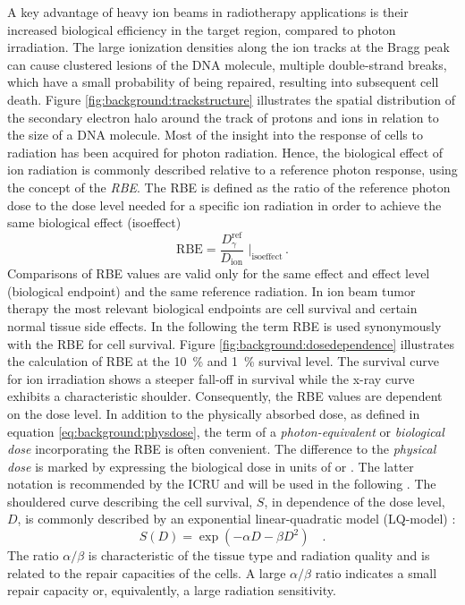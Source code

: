 A key advantage of heavy ion beams in radiotherapy applications is
their increased biological efficiency in the target region, compared
to photon irradiation. The large ionization densities along the ion
tracks at the Bragg peak can cause clustered lesions of the \ac{DNA}
molecule, \ie multiple double-strand breaks, which have a small
probability of being repaired, resulting into subsequent cell
death. Figure \ref{fig:background:trackstructure} illustrates the
spatial distribution of the secondary electron halo around the track
of protons and \Ctw ions in relation to the size of a \ac{DNA}
molecule. Most of the insight into the response of cells to radiation
has been acquired for photon radiation. Hence, the biological effect
of ion radiation is commonly described relative to a reference photon
response, using the concept of the \emph{\ac{RBE}}. The \ac{RBE} is
defined as the ratio of the reference photon dose to the dose level
needed for a specific ion radiation in order to achieve the same
biological effect (isoeffect)
\begin{equation}
  \text{RBE}=\frac{D_\gamma^\text{ref}}{D_\text{ion}}\,\,\bigg|_\text{isoeffect}\,.
  \label{eq:background:rbe}
\end{equation}
Comparisons of \acs{RBE} values are valid only for the same effect and
effect level (biological endpoint) and the same reference
radiation. In ion beam tumor therapy the most relevant biological
endpoints are cell survival and certain normal tissue side effects. In
the following the term \ac{RBE} is used synonymously with the \ac{RBE}
for cell survival. Figure \vref{fig:background:dosedependence}
illustrates the calculation of \ac{RBE} at the \SI{10}{\%} and
\SI{1}{\%} survival level.  The survival curve for ion irradiation
shows a steeper fall-off in survival while the x-ray curve exhibits a
characteristic shoulder. Consequently, the \ac{RBE} values are
dependent on the dose level.  In addition to the physically absorbed
dose, as defined in equation \eqref{eq:background:physdose}, the term
of a \emph{photon-equivalent} or \emph{biological dose} incorporating
the \ac{RBE} is often convenient. The difference to the \emph{physical
  dose} is marked by expressing the biological dose in units of
\si{\GyE} or \si{\GyRBE}. The latter notation is recommended by the
\ac{ICRU} and will be used in the following \citep{ICRU78}.  The
shouldered curve describing the cell survival, $S$, in dependence of
the dose level, $D$, is commonly described by an exponential
linear-quadratic model (LQ-model) \citep{Fowler1989}:
\begin{equation}
  S(D)=\exp\left(-\alpha D-\beta D^2\right)\quad.
\end{equation}
The ratio $\alpha/\beta$ is characteristic of the tissue type and
radiation quality and is related to the repair capacities of the
cells. A large $\alpha/\beta$ ratio indicates a small repair capacity
or, equivalently, a large radiation sensitivity.


